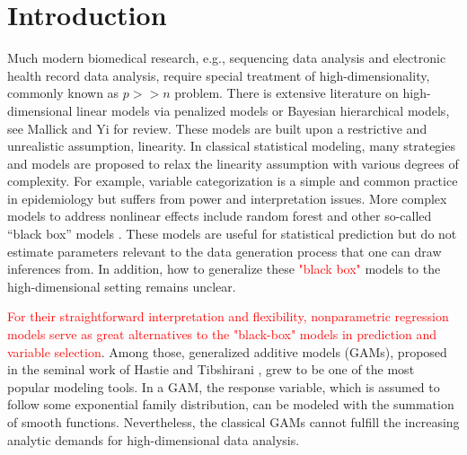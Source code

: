 \documentclass[AMA,STIX1COL,]{WileyNJD-v2}
\begin{document}
\pgfplotsset{compat=1.18}
\usetikzlibrary{shapes.geometric, arrows, positioning, calc, matrix, backgrounds, fit}
\newcommand{\bs}[1]{\boldsymbol{#1}}
\newcommand{\tp}{*}
\newcommand{\pr}{\text{Pr}}
\newcommand{\repa}{\text{repa}}
\newcommand{\simiid}{\overset{\text{iid}}{\sim}}
\newcommand{\bg}[1]{\textcolor{red}{#1}}

\section{Introduction}
\label{sec:intro}

Much modern biomedical research, e.g., sequencing data analysis and
electronic health record data analysis, require special treatment of
high-dimensionality, commonly known as \(p >> n\) problem. There is
extensive literature on high-dimensional linear models via penalized
models or Bayesian hierarchical models, see Mallick and Yi
\citep{Mallick2013} for review. These models are built upon a
restrictive and unrealistic assumption, linearity. In classical
statistical modeling, many strategies and models are proposed to relax
the linearity assumption with various degrees of complexity. For
example, variable categorization is a simple and common practice in
epidemiology but suffers from power and interpretation issues. More
complex models to address nonlinear effects include random forest and
other so-called ``black box'' models \citep{Breiman2001}. These models
are useful for statistical prediction but do not estimate parameters
relevant to the data generation process that one can draw inferences
from. In addition, how to generalize these \textcolor{red}{"black box"}
models to the high-dimensional setting remains unclear.

\textcolor{red}{For their straightforward interpretation and flexibility, nonparametric regression models serve as great alternatives to the "black-box" models in prediction and variable selection}.
Among those, generalized additive models (GAMs), proposed in the seminal
work of Hastie and Tibshirani \citep{Hastie1987}, grew to be one of the
most popular modeling tools. In a GAM, the response variable, which is
assumed to follow some exponential family distribution, can be modeled
with the summation of smooth functions. Nevertheless, the classical GAMs
cannot fulfill the increasing analytic demands for high-dimensional data
analysis.
\end{document}
